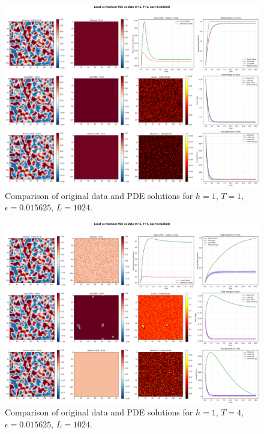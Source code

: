 \documentclass[11pt,a4paper]{article}
\begin{document}
\begin{figure}[!h]
    \centering
    \includegraphics[width=1.0\textwidth]{fig/compare_local_nonlocal_L1024_h1_T1_eps0.015625.png}
    \caption{Comparison of original data and PDE solutions for $h=1$, $T=1$, $\epsilon=0.015625$, $L=1024$.}
    \label{fig:pde_comparison_h1_T1_eps0.015625}
\end{figure}


\begin{figure}[!h]
    \centering
    \includegraphics[width=1.0\textwidth]{fig/compare_local_nonlocal_L1024_h1_T4_eps0.015625.png}
    \caption{Comparison of original data and PDE solutions for $h=1$, $T=4$, $\epsilon=0.015625$, $L=1024$.}
    \label{fig:pde_comparison_h1_T4_eps0.015625}
\end{figure}
\end{document}
